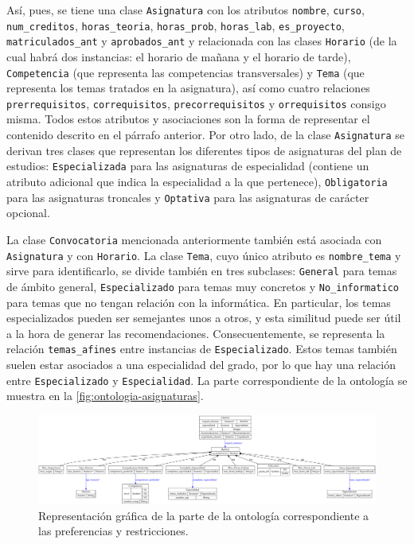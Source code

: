 Así, pues, se tiene una clase \texttt{Asignatura} con los atributos 
\texttt{nombre}, \texttt{curso}, \texttt{num\_creditos}, 
\texttt{horas\_teoria}, \texttt{horas\_prob}, \texttt{horas\_lab}, 
\texttt{es\_proyecto}, \texttt{matriculados\_ant} y \texttt{aprobados\_ant} y 
relacionada con las clases \texttt{Horario} (de la cual habrá dos instancias: 
el horario de mañana y el horario de tarde), \texttt{Competencia} (que 
representa las competencias transversales) y \texttt{Tema} (que representa 
los temas tratados en la asignatura), así como cuatro relaciones 
\texttt{prerrequisitos}, \texttt{correquisitos}, \texttt{precorrequisitos} y 
\texttt{orrequisitos} consigo misma. Todos estos atributos y asociaciones son 
la forma de representar el contenido descrito en el párrafo anterior. Por 
otro lado, de la clase \texttt{Asignatura} se derivan tres clases que 
representan los diferentes tipos de asignaturas del plan de estudios: 
\texttt{Especializada} para las asignaturas de especialidad (contiene un 
atributo adicional que indica la especialidad a la que pertenece), 
\texttt{Obligatoria} para las asignaturas troncales y \texttt{Optativa} para 
las asignaturas de carácter opcional. 

La clase \texttt{Convocatoria} mencionada anteriormente también está 
asociada con \texttt{Asignatura} y con \texttt{Horario}. La clase 
\texttt{Tema}, cuyo único atributo es \texttt{nombre\_tema} y sirve para 
identificarlo, se divide también en tres subclases: \texttt{General} para 
temas de ámbito general, \texttt{Especializado} para temas muy concretos y 
\texttt{No\_informatico} para temas que no tengan relación con la informática. 
En particular, los temas especializados pueden ser semejantes unos a otros, 
y esta similitud puede ser útil a la hora de generar las recomendaciones. 
Consecuentemente, se representa la relación \texttt{temas\_afines} entre 
instancias de \texttt{Especializado}. Estos temas también suelen estar 
asociados a una especialidad del grado, por lo que hay una relación entre 
\texttt{Especializado} y \texttt{Especialidad}.
La parte correspondiente de la ontología se muestra en la 
\autoref{fig:ontologia-asignaturas}.

\begin{figure}[ht]
    \centering
    \includegraphics[width=15cm]{ontologia-preferencias}
    \caption{Representación gráfica de la parte de la ontología 
        correspondiente a las preferencias y restricciones.}
    \label{fig:ontologia-preferencias}
\end{figure}

